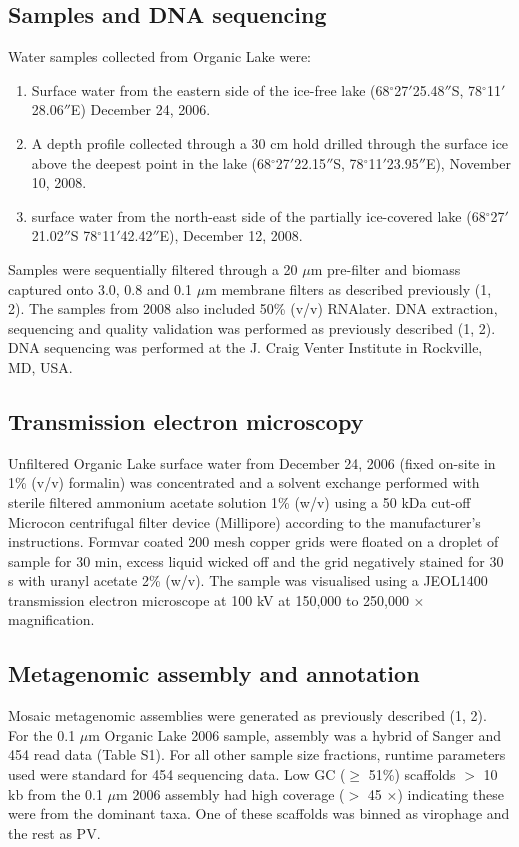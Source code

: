 \subsection{Samples and DNA sequencing}
Water samples collected from Organic Lake were: 

\begin{enumerate}
\item Surface water from the eastern side of the ice-free lake (68$^{\circ}$27$'$25.48$''$S, 78$^{\circ}$11$'$28.06$''$E) December 24, 2006.
\item A depth profile collected through a 30 cm hold drilled through the surface ice above the deepest point in the lake (68$^{\circ}$27$'$22.15$''$S, 78$^{\circ}$11$'$23.95$''$E), November 10, 2008. 
\item surface water from the north-east side of the partially ice-covered lake (68$^{\circ}$27$'$21.02$''$S 78$^{\circ}$11$'$42.42$''$E), December 12, 2008. 
\end{enumerate}

Samples were sequentially filtered through a 20 $\mu$m pre-filter and biomass captured onto 3.0, 0.8 and 0.1 $\mu$m membrane filters as described previously (1, 2). 
The samples from 2008 also included 50\% (v/v) RNAlater. 
DNA extraction, sequencing and quality validation was performed as previously described (1, 2). 
DNA sequencing was performed at the J. Craig Venter Institute in Rockville, MD, USA.  

\subsection{Transmission electron microscopy}
Unfiltered Organic Lake surface water from December 24, 2006 (fixed on-site in 1\% (v/v) formalin) was concentrated and a solvent exchange performed with sterile filtered ammonium acetate solution 1\% (w/v) using a 50 kDa cut-off Microcon centrifugal filter device (Millipore) according to the manufacturer’s instructions. 
Formvar coated 200 mesh copper grids were floated on a droplet of sample for 30 min, excess liquid wicked off and the grid negatively stained for 30 s with uranyl acetate 2\% (w/v). 
The sample was visualised using a JEOL1400 transmission electron microscope at 100 kV at 150,000 to 250,000 $\times$ magnification.

\subsection{Metagenomic assembly and annotation}
Mosaic metagenomic assemblies were generated as previously described (1, 2). 
For the 0.1 $\mu$m Organic Lake 2006 sample, assembly was a hybrid of Sanger and 454 read data (Table S1). 
For all other sample size fractions, runtime parameters used were standard for 454 sequencing data. 
Low GC ($\ge$ 51\%) scaffolds $>$ 10 kb from the 0.1 $\mu$m 2006 assembly had high coverage ($>$ 45 $\times$) indicating these were from the dominant taxa. 
One of these scaffolds was binned as virophage and the rest as PV. 

